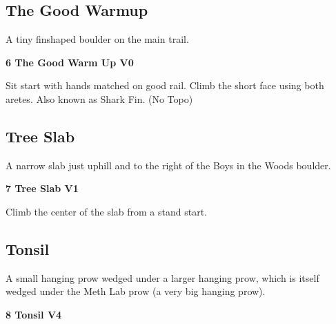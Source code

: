 \begin{multicols}{2}
			\subsection*{The Good Warmup}\label{bf:The Good Warmup}
			\begin{minipage}{\columnwidth}
			A tiny finshaped boulder on the main trail.
			\end{minipage}
			
					\begin{minipage}{\linewidth}	
					\label{rt:The Good Warm Up}
\colorbox{green!20}{
\parbox{0.95\textwidth}{
\textbf{
6 The Good Warm Up V0   
}
}
}

					\begin{adjustwidth}{0.5cm}{}				
					Sit start with hands matched on good rail. Climb the short face using both aretes. Also known as Shark Fin.
						\newline (No Topo) 
					\end{adjustwidth}
					\end{minipage}
			\subsection*{Tree Slab}\label{bf:Tree Slab}
			\begin{minipage}{\columnwidth}
			A narrow slab just uphill and to the right of the Boys in the Woods boulder.
			\end{minipage}
			
					\begin{minipage}{\linewidth}	
					\label{rt:Tree Slab}
\colorbox{green!20}{
\parbox{0.95\textwidth}{
\textbf{
7 Tree Slab V1    
}
}
}

					\begin{adjustwidth}{0.5cm}{}				
					Climb the center of the slab from a stand start.
					\end{adjustwidth}
					\end{minipage}
			\subsection*{Tonsil}\label{bf:Tonsil}
			\begin{minipage}{\columnwidth}
			A small hanging prow wedged under a larger hanging prow, which is itself wedged under the Meth Lab prow (a very big hanging prow).
			\end{minipage}
			
					\begin{minipage}{\linewidth}	
					\label{rt:Tonsil}
\colorbox{RoyalBlue!20}{
\parbox{0.95\textwidth}{
\textbf{
8 Tonsil V4    
}
}
}


\end{minipage}
\end{multicols}
